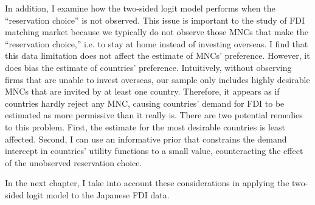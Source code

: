 In addition, I examine how the two-sided logit model performs when the
``reservation choice'' is not observed. This issue is important to the study of
FDI matching market because we typically do not observe those MNCs that make the
``reservation choice,'' i.e. to stay at home instead of investing overseas. I
find that this data limitation does not affect the estimate of MNCs' preference.
However, it does bias the estimate of countries' preference. Intuitively,
without observing firms that are unable to invest overseas, our sample only
includes highly desirable MNCs that are invited by at least one country.
Therefore, it appears as if countries hardly reject any MNC, causing countries'
demand for FDI to be estimated as more permissive than it really is. There are
two potential remedies to this problem. First, the estimate for the most
desirable countries is least affected. Second, I can use an informative prior
that constrains the demand intercept in countries' utility functions to a small
value, counteracting the effect of the unobserved reservation choice.

In the next chapter, I take into account these considerations in applying the
two-sided logit model to the Japanese FDI data.


